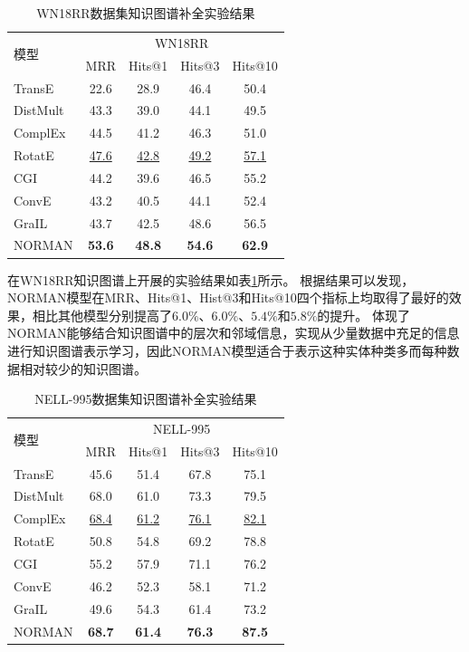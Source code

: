 \documentclass[algorithmlist, AutoFakeBold, AutoFakeSlant, figurelist, tablelist, nomlist, engineering]{seuthesix}
\begin{document}
\begin{table}[t]
  \centering
  \caption{WN18RR数据集知识图谱补全实验结果}
  \begin{tabular*}{0.95\textwidth}{@{\extracolsep{\fill}}lcccc}
    \toprule[1pt]
    \multirow{2}{*}{模型} & \multicolumn{4}{c}{WN18RR} \\
      & MRR & Hits@1 & Hits@3 & Hits@10 \\ \hline
    TransE & 22.6 & 28.9 & 46.4 & 50.4 \\
    DistMult & 43.3 & 39.0 & 44.1 & 49.5 \\
    ComplEx & 44.5 & 41.2 & 46.3 & 51.0 \\
    RotatE & \underline{47.6} & \underline{42.8} & \underline{49.2} & \underline{57.1} \\
    CGI & 44.2 & 39.6 & 46.5 & 55.2 \\
    ConvE & 43.2 & 40.5 & 44.1 & 52.4 \\
    GraIL & 43.7 & 42.5 & 48.6 & 56.5 \\
    NORMAN & \textbf{53.6} & \textbf{48.8} & \textbf{54.6} & \textbf{62.9} \\
    \bottomrule[1pt]
  \end{tabular*}
  \label{Experiment1_WN18RR}
\end{table}

在WN18RR知识图谱上开展的实验结果如表\ref{Experiment1_WN18RR}所示。
根据结果可以发现，NORMAN模型在MRR、Hits@1、Hist@3和Hits@10四个指标上均取得了最好的效果，相比其他模型分别提高了$6.0\%$、$6.0\%$、$5.4\%$和$5.8\%$的提升。
体现了NORMAN能够结合知识图谱中的层次和邻域信息，实现从少量数据中充足的信息进行知识图谱表示学习，因此NORMAN模型适合于表示这种实体种类多而每种数据相对较少的知识图谱。

\begin{table}[t]
  \centering
  \caption{NELL-995数据集知识图谱补全实验结果}
  \begin{tabular*}{0.95\textwidth}{@{\extracolsep{\fill}}lcccc}
    \toprule[1pt]
    \multirow{2}{*}{模型} & \multicolumn{4}{c}{NELL-995} \\
      & MRR & Hits@1 & Hits@3 & Hits@10 \\ \hline
    TransE & 45.6 & 51.4 & 67.8 & 75.1 \\
    DistMult & 68.0 & 61.0 & 73.3 & 79.5 \\
    ComplEx & \underline{68.4} & \underline{61.2} & \underline{76.1} & \underline{82.1} \\
    RotatE & 50.8 & 54.8 & 69.2 & 78.8 \\
    CGI & 55.2 & 57.9 & 71.1 & 76.2 \\
    ConvE & 46.2 & 52.3 & 58.1 & 71.2 \\
    GraIL & 49.6 & 54.3 & 61.4 & 73.2 \\
    NORMAN & \textbf{68.7} & \textbf{61.4} & \textbf{76.3} & \textbf{87.5} \\
    \bottomrule[1pt]
  \end{tabular*}
  \label{Experiment1_NELL-995}
\end{table}
\end{document}
